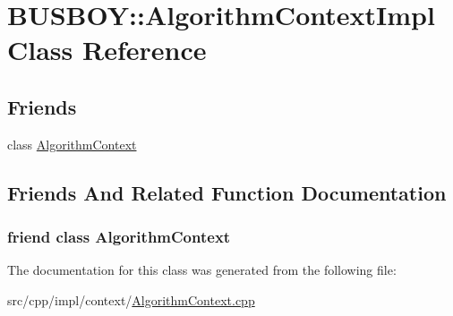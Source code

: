 \hypertarget{classBUSBOY_1_1AlgorithmContextImpl}{
\section{BUSBOY::AlgorithmContextImpl Class Reference}
\label{classBUSBOY_1_1AlgorithmContextImpl}
}
\subsection*{Friends}
\begin{DoxyCompactItemize}
\item 
class \hyperlink{classBUSBOY_1_1AlgorithmContextImpl_a24d2cb950047a00ca30a6d67ab87549d}{AlgorithmContext}
\end{DoxyCompactItemize}


\subsection{Friends And Related Function Documentation}
\hypertarget{classBUSBOY_1_1AlgorithmContextImpl_a24d2cb950047a00ca30a6d67ab87549d}{
\subsubsection[{AlgorithmContext}]{\setlength{\rightskip}{0pt plus 5cm}friend class {\bf AlgorithmContext}}}
\label{classBUSBOY_1_1AlgorithmContextImpl_a24d2cb950047a00ca30a6d67ab87549d}


The documentation for this class was generated from the following file:\begin{DoxyCompactItemize}
\item 
src/cpp/impl/context/\hyperlink{AlgorithmContext_8cpp}{AlgorithmContext.cpp}\end{DoxyCompactItemize}

